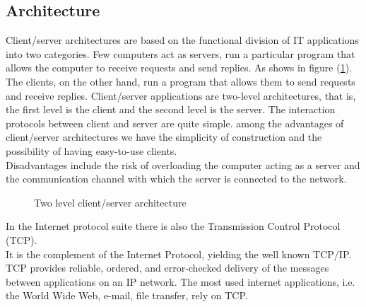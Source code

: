 \subsection{Architecture}
\label{ssec:soft-client-server}
Client/server architectures are based on the functional division of IT
applications into two categories. Few computers act as servers, run a particular
program that allows the computer to receive requests and send replies.
As shows in figure (\ref{fig:client-server architecture}).\hfill \break
The clients, on the other hand, run a program that allows them to send requests and
receive replies. Client/server applications are two-level architectures, that
is, the first level is the client and the second level is the server. The
interaction protocols between client and server are quite simple. among the
advantages of client/server architectures we have the simplicity of
construction and the possibility of having easy-to-use clients.\\ 
Disadvantages include the risk of overloading the computer acting as a server 
and the communication channel with which the server is connected to the network.\cite{mandrioli2008informatica}\hfill \break
%
%
\begin{figure}[ht]
	\centering
	\resizebox{0.65\textwidth}{!}{}
	\caption{Two level client/server architecture} 
	\label{fig:client-server architecture}
\end{figure}
%
\newline In the Internet protocol suite there is also the Transmission Control Protocol
(TCP).\\
It is the complement of the Internet Protocol, yielding the well known TCP/IP.\\ 
TCP provides reliable, ordered, and error-checked delivery of the
messages between applications on an IP network. The most used internet
applications, i.e. the World Wide Web, e-mail, file transfer, rely on TCP.
%
%
\begin{figure}[htb]
    \centering
     	\quad
    \label{fig:tcp-scme}
\end{figure}
%
